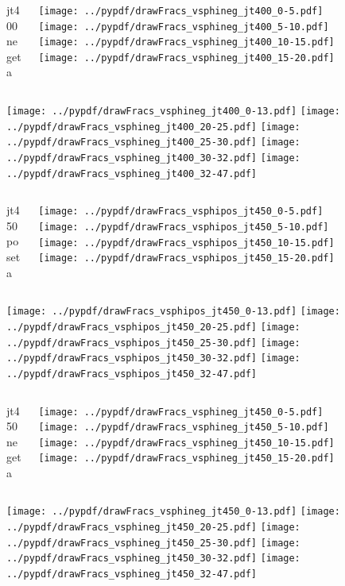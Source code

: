 \documentclass[aspectratio=169]{beamer}
\begin{document}
\begin{figure}[p]
\flushleft
\begin{columns}[T]
\begin{column}{.2\linewidth}
\centering
jt400 negeta
\end{column}
\begin{column}{.8\linewidth}
\texttt{[image: ../pypdf/drawFracs\_vsphineg\_jt400\_0-5.pdf]}
\texttt{[image: ../pypdf/drawFracs\_vsphineg\_jt400\_5-10.pdf]}
\texttt{[image: ../pypdf/drawFracs\_vsphineg\_jt400\_10-15.pdf]}
\texttt{[image: ../pypdf/drawFracs\_vsphineg\_jt400\_15-20.pdf]}
\end{column}
\end{columns}
\texttt{[image: ../pypdf/drawFracs\_vsphineg\_jt400\_0-13.pdf]}
\texttt{[image: ../pypdf/drawFracs\_vsphineg\_jt400\_20-25.pdf]}
\texttt{[image: ../pypdf/drawFracs\_vsphineg\_jt400\_25-30.pdf]}
\texttt{[image: ../pypdf/drawFracs\_vsphineg\_jt400\_30-32.pdf]}
\texttt{[image: ../pypdf/drawFracs\_vsphineg\_jt400\_32-47.pdf]}
\end{figure}

\begin{figure}[p]
\flushleft
\begin{columns}[T]
\begin{column}{.2\linewidth}
\centering
jt450 poseta
\end{column}
\begin{column}{.8\linewidth}
\texttt{[image: ../pypdf/drawFracs\_vsphipos\_jt450\_0-5.pdf]}
\texttt{[image: ../pypdf/drawFracs\_vsphipos\_jt450\_5-10.pdf]}
\texttt{[image: ../pypdf/drawFracs\_vsphipos\_jt450\_10-15.pdf]}
\texttt{[image: ../pypdf/drawFracs\_vsphipos\_jt450\_15-20.pdf]}
\end{column}
\end{columns}
\texttt{[image: ../pypdf/drawFracs\_vsphipos\_jt450\_0-13.pdf]}
\texttt{[image: ../pypdf/drawFracs\_vsphipos\_jt450\_20-25.pdf]}
\texttt{[image: ../pypdf/drawFracs\_vsphipos\_jt450\_25-30.pdf]}
\texttt{[image: ../pypdf/drawFracs\_vsphipos\_jt450\_30-32.pdf]}
\texttt{[image: ../pypdf/drawFracs\_vsphipos\_jt450\_32-47.pdf]}
\end{figure}

\begin{figure}[p]
\flushleft
\begin{columns}[T]
\begin{column}{.2\linewidth}
\centering
jt450 negeta
\end{column}
\begin{column}{.8\linewidth}
\texttt{[image: ../pypdf/drawFracs\_vsphineg\_jt450\_0-5.pdf]}
\texttt{[image: ../pypdf/drawFracs\_vsphineg\_jt450\_5-10.pdf]}
\texttt{[image: ../pypdf/drawFracs\_vsphineg\_jt450\_10-15.pdf]}
\texttt{[image: ../pypdf/drawFracs\_vsphineg\_jt450\_15-20.pdf]}
\end{column}
\end{columns}
\texttt{[image: ../pypdf/drawFracs\_vsphineg\_jt450\_0-13.pdf]}
\texttt{[image: ../pypdf/drawFracs\_vsphineg\_jt450\_20-25.pdf]}
\texttt{[image: ../pypdf/drawFracs\_vsphineg\_jt450\_25-30.pdf]}
\texttt{[image: ../pypdf/drawFracs\_vsphineg\_jt450\_30-32.pdf]}
\texttt{[image: ../pypdf/drawFracs\_vsphineg\_jt450\_32-47.pdf]}
\end{figure}
\end{document}
